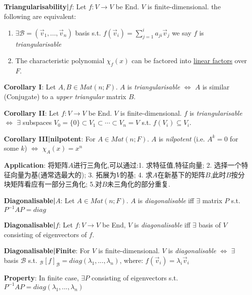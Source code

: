 \documentclass[9pt]{article}
\begin{document}
\textbf{Triangularisability|$f$}: Let $f:V\to V$ be End. $V$ is finite-dimensional. the following are equivalent:
\begin{enumerate}[itemsep=-2pt, topsep=-2pt]
    \item $\exists \mathcal{B}=(\vec{v}_1,...,\vec{v}_n)$ basis s.t. $f(\vec{v}_i)=\sum_{j=1}^ia_{ji}\vec{v}_j$  \qquad we say $f$ is \textit{triangularisable}
    \item The characteristic polynomial $\chi_f(x)$ can be factored into \underline{linear factors} over $F$. 
\end{enumerate}

\quad \textbf{Corollary I}: Let $A,B \in Mat(n;F)$. \quad $A$ is \textit{triangularisable} $\Leftrightarrow$ $A$ is similar (Conjugate) to a \textit{upper triangular} matrix $B$.

\quad \textbf{Corollary II}: {\small Let $f:V\to V$ be End. $V$ is finite-dimensional. \quad $f$ is \textit{triangularisable} $\Leftrightarrow$ $\exists$ subspaces $V_0=\{0\}\subset V_1\subset\cdots\subset V_n=V$ s.t. $f(V_i)\subseteq V_i$.}

\quad \textbf{Corollary III|nilpotent}: For $A\in Mat(n;F)$. $A$ is \textit{nilpotent} (i.e. $A^k=0$ for some $k$) $\Leftrightarrow$ $\chi_A(x)=x^n$

\quad \textbf{Application}: {\tiny 将矩阵$A$进行三角化,可以通过:1. 求特征值,特征向量; 2. 选择一个特征向量为基(通常选最大的); 3. 拓展为$V$的基; 4. 求$A$在新基下的矩阵$B$,此时$B$按分块矩阵看应有一部分三角化; 5.对$B$未三角化的部分重复.}

\textbf{Diagonalisable|$A$}: Let $A\in Mat(n;F)$. $A$ is \textit{diagonalisable} iff $\exists$ matrix $P$ s.t. $P^{-1}AP=diag$

\textbf{Diagonalisable|$f$}: Let $f:V\to V$ be End, $V$ is \textit{diagonalisable} iff $\exists$ basis of $V$ consisting of eigenvectors of $f$.

\quad \textbf{Diagonalisable|Finite}: {\small For $V$ is finite-dimensional. \quad $V$ is \textit{diagonalisable} $\Leftrightarrow$ $\exists$ basis $\mathcal{B}$ s.t. $_{\mathcal{B}}[f]_{\mathcal{B}}=diag(\lambda_1,...,\lambda_n)$, \quad where: $f(\vec{v}_i)=\lambda_i\vec{v}_i$}

\quad \textbf{Property}: In finite case, $\exists P$ consisting of eigenvectors s.t. $P^{-1}AP=diag(\lambda_1,...,\lambda_n)$
\end{document}

